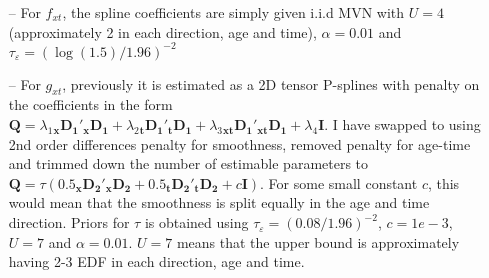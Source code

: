 \documentclass[12pt,a4paper]{article}
\begin{document}
\begin{itemize}
	\item[--] For $f_{xt}$, the spline coefficients are simply given i.i.d MVN	with $U = 4$ (approximately 2 in each direction, age and time), $\alpha = 0.01$ and $\tau_{\varepsilon} = (\log(1.5)/1.96)^{-2}$
	
	\item[--] For $g_{xt}$, previously it is estimated as a 2D tensor P-splines with penalty on the coefficients in the form $\boldsymbol{Q} = \lambda_1 \boldsymbol{{_xD_1}'{_xD_1}} + \lambda_2 \boldsymbol{{_tD_1}'{_tD_1}} + \lambda_3 \boldsymbol{{_{xt}D_1}'{_{xt}D_1}} + \lambda_4 \boldsymbol{I}$. I have swapped to using 2nd order differences penalty for smoothness, removed penalty for age-time and trimmed down the number of estimable parameters to $\boldsymbol{Q} = \tau (0.5 \boldsymbol{{_xD_2}'{_xD_2}} + 0.5 \boldsymbol{{_tD_2}'{_tD_2}} + c \boldsymbol{I})$. For some small constant $c$, this would mean that the smoothness is split equally in the age and time direction. Priors for $\tau$ is obtained using $\tau_{\varepsilon} = (0.08/1.96) ^{-2}$, $c = 1e-3$, $U = 7$ and $\alpha = 0.01$. $U = 7$ means that the upper bound is approximately having 2-3 EDF in each direction, age and time.
	

\end{itemize}
\end{document}
